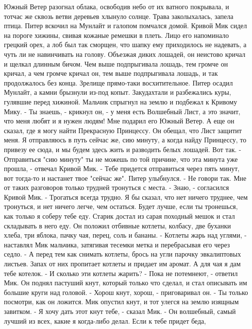     Южный Ветер разогнал облака, освободив небо от их ватного 
покрывала, и тотчас же сквозь ветви деревьев хлынуло солнце. Трава 
заколыхалась, запела птица. Питер вскочил на Мунлайт и галопом 
помчался домой. Кривой Мик сидел на пороге хижины, свивая кожаные 
ремешки в плеть. Лицо его напоминало грецкий орех, а лоб был так 
сморщен, что шапку ему приходилось не надевать, а чуть ли не 
навинчивать на голову. Объезжая диких лошадей, он неистово кричал и 
щелкал длинным бичом. Чем выше подпрыгивала лошадь, тем громче он 
кричал, а чем громче кричал он, тем выше подпрыгивала лошадь, и так 
продолжалось без конца. Зрелище прямо-таки восхитительное.
    Питер осадил Мунлайт, а камни брызнули из-под копыт. Закудахтали и 
разбежались куры, гулявшие перед хижиной. Мальчик спрыгнул на землю и 
подбежал к Кривому Мику.
    - Ты знаешь, - крикнул он, - у меня есть Волшебный Лист, а это 
значит, что меня любят и я нужен людям! Мне подарил его Южный Ветер. А 
еще он сказал, где я могу найти Прекрасную Принцессу. Он обещал, что 
Лист защитит меня. Я отправляюсь в путь сейчас же, сию минуту, а когда 
найду Принцессу, то привезу ее сюда, и мы будем здесь жить и разводить 
белых лошадей. Вот так.
    - Отправиться "сию минуту" ты не можешь по той причине, что эта 
минута уже прошла, - отвечал Кривой Мик. - Тебе придется отправиться 
через пять минут, вот тогда-то и настанет твое "сейчас же".
    Питер улыбнулся.
    - Не говори так. Мне от таких разговоров только трудней тронуться 
с места.
    - Знаю, - согласился Кривой Мик. - Трогаться всегда трудно. Я бы 
сказал, что нет ничего труднее, чем тронуться, и нет ничего легче, чем 
остаться. Будет лучше, если ты тронешься, как только я соберу тебе 
еду.
    Старик достал из сарая походный мешок и стал складывать в него 
еду. Он положил отбивные котлеты, колбасу, две буханки хлеба, три 
яблока, пачку чая, перец, соль и бананы.
    - Котлеты жарь над углями, - наставлял Мик мальчика, затягивая 
тесемки метка и перебрасывая его через седло. - А перед тем как 
снимать котлеты, брось на угли парочку эвкалиптовых листьев. Запах от 
них пропитает котлеты и придает им аромат. А для чая я дам тебе 
котелок.
    - И сколько эти котлеты жарить?
    - Пока не потемнеют, - ответил Мик. Он поднял пастуший кнут, 
который только что сделал, и стал описывать им большие круги над 
головой. - Хорош кнут, хорош, - приговаривал он. - Ты только посмотри, 
как он ложится.
    Мик опустил кнут, и тот улегся на землю изящным завитком.
    - Я хочу дать этот кнут тебе, - сказал Мик. - Он волшебный, самый 
лучший из всех, какие я когда-либо делал. Если к тебе придет беда, 
